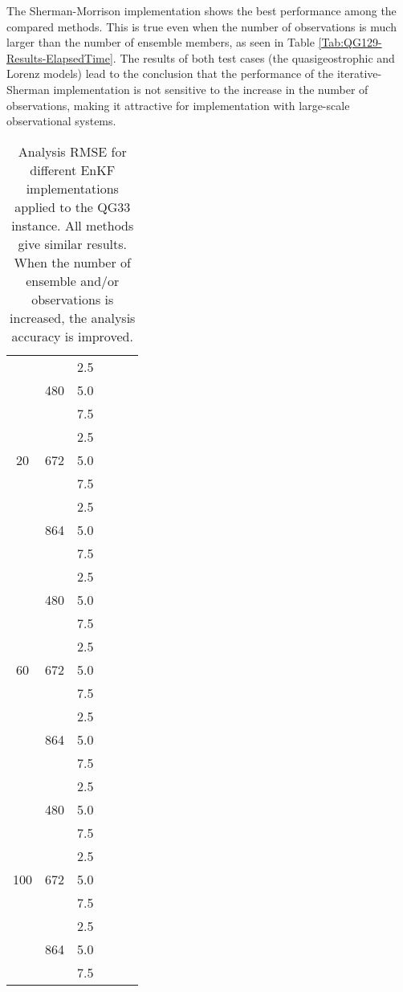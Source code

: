 \documentclass[12pt]{article}
\begin{document}
The Sherman-Morrison implementation shows the best performance among the compared methods.
This is true even when the number of observations is much larger than the number of ensemble members, as seen in Table  \ref{Tab:QG129-Results-ElapsedTime}. The results of both test cases (the quasigeostrophic and Lorenz models) lead to the conclusion that the performance of the iterative-Sherman implementation is not sensitive to the increase in the number of observations, making it attractive for implementation with large-scale observational systems.


\begin{table}[H]
\centering
{\footnotesize
\begin{tabular}{|c|c|c|c|c|c|} \hline
 &  &  &  &  &  \\ \hline


\multirow{9}{*}{20} &  \multirow{3}{*}{480}  & 2.5 &  &  &  \\
& & 5.0 &  &  &   \\ 
& & 7.5 &  &  &   \\ 
\cline{2-6}
&  \multirow{3}{*}{672}  & 2.5 &  &  &  \\
& & 5.0 &  &  &   \\ 
& & 7.5 &  &  &   \\ 
\cline{2-6}
&  \multirow{3}{*}{864}  & 2.5 &  &  &  \\
& & 5.0 &  &  &   \\ 
& & 7.5 &  &  &   \\ 
\cline{1-6}
\multirow{9}{*}{60} &  \multirow{3}{*}{480}  & 2.5 &  &  &  \\
& & 5.0 &  &  &   \\ 
& & 7.5 &  &  &   \\ 
\cline{2-6}
&  \multirow{3}{*}{672}  & 2.5 &  &  &  \\
& & 5.0 &  &  &   \\ 
& & 7.5 &  &  &   \\ 
\cline{2-6}
&  \multirow{3}{*}{864}  & 2.5 &  &  &  \\
& & 5.0 &  &  &   \\ 
& & 7.5 &  &  &   \\ 
\cline{1-6}
\multirow{9}{*}{100} &  \multirow{3}{*}{480}  & 2.5 &  &  &  \\
& & 5.0 &  &  &   \\ 
& & 7.5 &  &  &   \\ 
\cline{2-6}
&  \multirow{3}{*}{672}  & 2.5 &  &  &  \\
& & 5.0 &  &  &   \\ 
& & 7.5 &  &  &   \\ 
\cline{2-6}
&  \multirow{3}{*}{864}  & 2.5 &  &  &  \\
& & 5.0 &  &  &   \\ 
& & 7.5 &  &  &   \\ 
\hline
\end{tabular}
}
\caption{Analysis RMSE for different EnKF implementations applied to the QG33 instance.
All methods give similar results. When the number of ensemble and/or observations is increased, the analysis accuracy is improved.}
\label{Tab:QG33-Results-RMSE}
\end{table}
\end{document}
